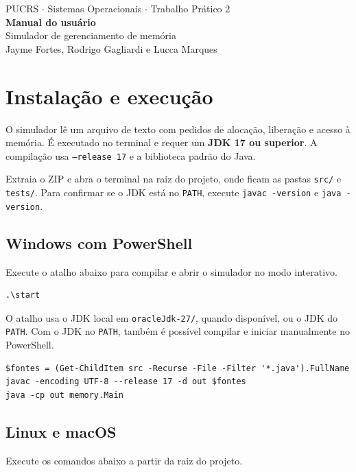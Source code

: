 \documentclass[11pt,a4paper]{article}
\newcommand{\cmd}[1]{\texttt{#1}}
\begin{document}
\begin{center}
    {\small PUCRS \enspace $\cdot$ \enspace Sistemas Operacionais \enspace $\cdot$ \enspace Trabalho Prático 2}\\[6pt]
    {\LARGE\bfseries Manual do usuário}\\[4pt]
    {\large Simulador de gerenciamento de memória}\\[8pt]
    Jayme Fortes, Rodrigo Gagliardi e Lucca Marques
\end{center}

\section{Instalação e execução}

O simulador lê um arquivo de texto com pedidos de alocação, liberação e
acesso à memória. É executado no terminal e requer um \textbf{JDK 17 ou
superior}. A compilação usa \cmd{--release 17} e a biblioteca padrão do Java.

Extraia o ZIP e abra o terminal na raiz do projeto, onde ficam as pastas
\cmd{src/} e \cmd{tests/}. Para confirmar se o JDK está no \cmd{PATH},
execute \cmd{javac -version} e \cmd{java -version}.

\subsection*{Windows com PowerShell}

Execute o atalho abaixo para compilar e abrir o simulador no modo interativo.

\begin{verbatim}
.\start
\end{verbatim}

O atalho usa o JDK local em \cmd{oracleJdk-27/}, quando disponível, ou
o JDK do \cmd{PATH}. Com o JDK no \cmd{PATH}, também é possível compilar
e iniciar manualmente no PowerShell.

\begin{verbatim}
$fontes = (Get-ChildItem src -Recurse -File -Filter '*.java').FullName
javac -encoding UTF-8 --release 17 -d out $fontes
java -cp out memory.Main
\end{verbatim}

\subsection*{Linux e macOS}

Execute os comandos abaixo a partir da raiz do projeto.
\end{document}
